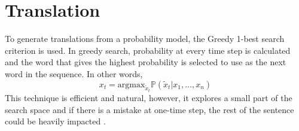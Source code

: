 \section{Translation}
To generate translations from a probability model, the Greedy 1-best search criterion is used. In greedy search, probability at every time step is calculated and the word that gives the highest probability is selected to use as the next word in the sequence. In other words,
\begin{equation}
x_t = \text{argmax} _{\tilde{x}_t} \mathbb{P}(\tilde{x}_t | x_1, \ldots, x_n)
\end{equation}
This technique is efficient and natural, however, it explores a small part of the search space and if there is a mistake at one-time step, the rest of the sentence could be heavily impacted \cite{manning2019cs224n}.